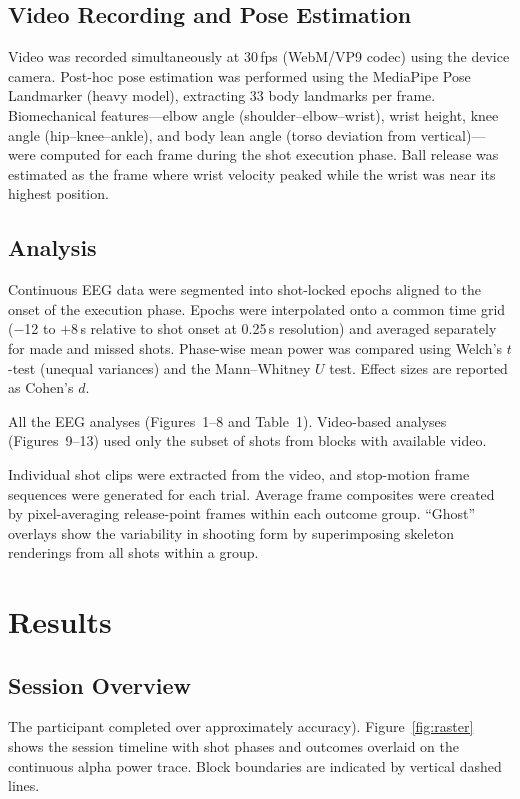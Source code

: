 \documentclass[11pt,a4paper]{article}
\begin{document}
\subsection{Video Recording and Pose Estimation}
Video was recorded simultaneously at 30\,fps (WebM/VP9 codec) using the device
camera. Post-hoc pose estimation was performed using the MediaPipe Pose
Landmarker (heavy model), extracting 33 body landmarks per frame.
Biomechanical features---elbow angle (shoulder--elbow--wrist), wrist height,
knee angle (hip--knee--ankle), and body lean angle (torso deviation from
vertical)---were computed for each frame during the shot execution phase. Ball
release was estimated as the frame where wrist velocity peaked while the wrist
was near its highest position.

\subsection{Analysis}
Continuous EEG data were segmented into shot-locked epochs aligned to the onset
of the execution phase. Epochs were interpolated onto a common time grid
($-$12 to $+$8\,s relative to shot onset at 0.25\,s resolution) and averaged
separately for made and missed shots. Phase-wise mean power was compared using
Welch's $t$-test (unequal variances) and the Mann--Whitney $U$ test. Effect
sizes are reported as Cohen's $d$.

All %
the EEG analyses (Figures~1--8 and Table~1). Video-based analyses
(Figures~9--13) used only the subset of shots from blocks with available video.

Individual shot clips were extracted from the video, and stop-motion frame
sequences were generated for each trial. Average frame composites were created
by pixel-averaging release-point frames within each outcome group. ``Ghost''
overlays show the variability in shooting form by superimposing skeleton
renderings from all shots within a group.

\section{Results}

\subsection{Session Overview}
The participant completed %
over approximately %
accuracy). Figure~\ref{fig:raster} shows the session timeline with shot phases
and outcomes overlaid on the continuous alpha power trace. Block boundaries are
indicated by vertical dashed lines.
\end{document}
